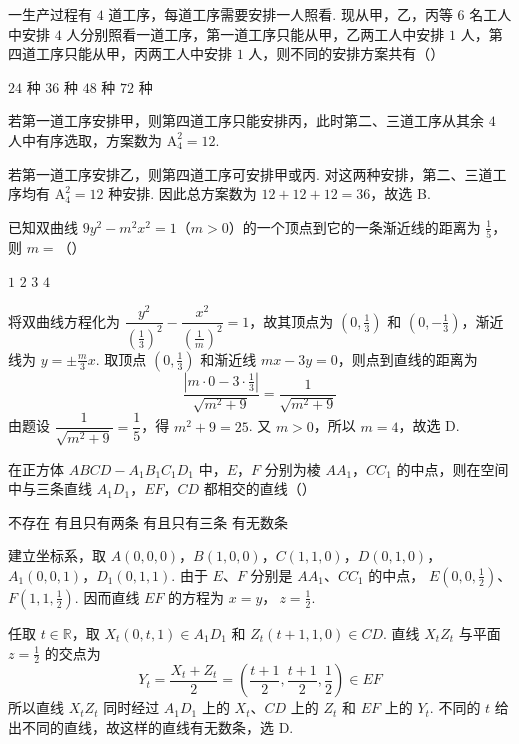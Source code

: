 \begin{problem}
一生产过程有 \(4\text{ 道}\)工序，每道工序需要安排一人照看. 现从甲，乙，丙等 \(6\text{ 名}\)工人中安排 \(4\text{ 人}\)分别照看一道工序，第一道工序只能从甲，乙两工人中安排 \(1\text{ 人}\)，第四道工序只能从甲，丙两工人中安排 \(1\text{ 人}\)，则不同的安排方案共有（\quad）

\choices
    {\(24\text{ 种}\)}
    {\(36\text{ 种}\)}
    {\(48\text{ 种}\)}
    {\(72\text{ 种}\)}

\begin{solution}
若第一道工序安排甲，则第四道工序只能安排丙，此时第二、三道工序从其余 \(4\) 人中有序选取，方案数为 \(\mathrm A_4^2=12\).

若第一道工序安排乙，则第四道工序可安排甲或丙. 对这两种安排，第二、三道工序均有 \(\mathrm A_4^2=12\) 种安排. 因此总方案数为
\(12+12+12=36\)，故选 B.
\end{solution}
\end{problem}

\begin{problem}
已知双曲线 \(9y^{2} - m^{2}x^{2} = 1\)（\(m > 0\)）的一个顶点到它的一条渐近线的距离为 \(\frac{1}{5}\)，则 \(m =\)（\quad）

\choices
    {\(1\)}
    {\(2\)}
    {\(3\)}
    {\(4\)}

\begin{solution}
将双曲线方程化为
\(\dfrac{y^2}{(\frac{1}{3})^2}-\dfrac{x^2}{(\frac{1}{m})^2}=1\)，故其顶点为 \(\left(0,\frac{1}{3}\right)\) 和 \(\left(0,-\frac{1}{3}\right)\)，渐近线为 \(y=\pm\frac{m}{3}x\). 取顶点 \(\left(0,\frac{1}{3}\right)\) 和渐近线 \(mx-3y=0\)，则点到直线的距离为
\[
\frac{\left|m\cdot0-3\cdot\frac{1}{3}\right|}{\sqrt{m^2+9}}=\frac{1}{\sqrt{m^2+9}}
\]
由题设 \(\dfrac{1}{\sqrt{m^2+9}}=\dfrac{1}{5}\)，得 \(m^2+9=25\). 又 \(m>0\)，所以 \(m=4\)，故选 D.
\end{solution}
\end{problem}

\begin{problem}
在正方体 \(ABCD - A_{1}B_{1}C_{1}D_{1}\) 中，\(E\)，\(F\) 分别为棱 \(AA_{1}\)，\(CC_{1}\) 的中点，则在空间中与三条直线 \(A_{1}D_{1}\)，\(EF\)，\(CD\) 都相交的直线（\quad）

\choices
    {不存在}
    {有且只有两条}
    {有且只有三条}
    {有无数条}

\begin{solution}
建立坐标系，取
\(A(0,0,0)\)，\(B(1,0,0)\)，\(C(1,1,0)\)，\(D(0,1,0)\)，\(A_1(0,0,1)\)，\(D_1(0,1,1)\). 由于 \(E\)、\(F\) 分别是 \(AA_1\)、\(CC_1\) 的中点，
\(E(0,0,\frac{1}{2})\)、\(F(1,1,\frac{1}{2})\). 因而直线 \(EF\) 的方程为
\(x=y\)，\(\ z=\frac{1}{2}\).

任取 \(t\in\mathbb R\)，取 \(X_t(0,t,1)\in A_1D_1\) 和 \(Z_t(t+1,1,0)\in CD\). 直线 \(X_tZ_t\) 与平面 \(z=\frac{1}{2}\) 的交点为
\[
Y_t=\frac{X_t+Z_t}{2}=\left(\frac{t+1}{2},\frac{t+1}{2},\frac{1}{2}\right)\in EF
\]
所以直线 \(X_tZ_t\) 同时经过 \(A_1D_1\) 上的 \(X_t\)、\(CD\) 上的 \(Z_t\) 和 \(EF\) 上的 \(Y_t\). 不同的 \(t\) 给出不同的直线，故这样的直线有无数条，选 D.
\end{solution}
\end{problem}

